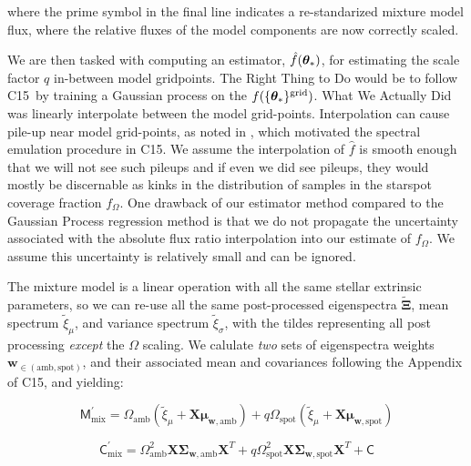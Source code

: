 \documentclass[twocolumn]{emulateapj}%
\newcommand{\iancze}{{\sc C15}}
\begin{document}
where the prime symbol in the final line indicates a re-standarized mixture model flux, where the relative fluxes of the model components are now correctly scaled.

We are then tasked with computing an estimator, $\hat f({\bm \theta}_{\ast})$, for estimating the scale factor $q$ in-between model gridpoints.  The Right Thing to Do would be to follow \iancze\ by training a Gaussian process on the $f(\{{\bm \theta}_{\ast}\}^\textrm{grid})$.  What We Actually Did was linearly interpolate between the model grid-points.  Interpolation can cause pile-up near model grid-points, as noted in \citet{cottaar14}, which motivated the spectral emulation procedure in \iancze.  We assume the interpolation of $\hat f$ is smooth enough that we will not see such pileups and if even we did see pileups, they would mostly be discernable as kinks in the distribution of samples in the starspot coverage fraction $f_{\Omega}$.  One drawback of our estimator method compared to the Gaussian Process regression method is that we do not propagate the uncertainty associated with the absolute flux ratio interpolation into our estimate of $f_{\Omega}$.  We assume this uncertainty is relatively small and can be ignored.

The mixture model is a linear operation with all the same stellar extrinsic parameters, so we can re-use all the same post-processed eigenspectra $\widetilde{\mathbf{\Xi}}$, mean spectrum $\widetilde{\xi}_\mu$, and variance spectrum $\widetilde{\xi}_\sigma$, with the tildes representing all post processing \emph{except} the $\Omega$ scaling.  We calulate \emph{two} sets of eigenspectra weights $\mathbf{w}_{\in (\mathrm{amb}, \mathrm{spot})}$, and their associated mean and covariances following the Appendix of \iancze, and yielding:

\begin{equation}
  \mathsf{M}_{\mathrm{mix}}^\prime = \Omega_{\mathrm{amb}} (\widetilde{\xi}_\mu + \mathbf{X} \mathbf{\mu}_{\mathbf{w}, \mathrm{amb}}) + q \Omega_{\mathrm{spot}} (\widetilde{\xi}_\mu + \mathbf{X} \mathbf{\mu}_{\mathbf{w}, \mathrm{spot}})
\end{equation}

\begin{equation}
  \mathsf{C}_{\mathrm{mix}}^\prime = \Omega_{\mathrm{amb}}^2 \mathbf{X} \mathbf{\Sigma}_\mathbf{w, \mathrm{amb}} \mathbf{X}^T + q \Omega_{\mathrm{spot}}^2 \mathbf{X} \mathbf{\Sigma}_\mathbf{w, \mathrm{spot}} \mathbf{X}^T + \mathsf{C}
  \label{eqn:modC}
\end{equation}
\end{document}
